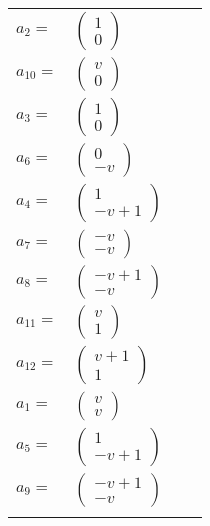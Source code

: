 \documentclass[1p]{elsarticle_modified}
\theoremstyle{definition}
\begin{document}
\begin{tabular}{m{7pt} m{180pt} m{7pt} m{180pt} }
\flushright $a_{2}=$&$\begin{pmatrix}1\\0\end{pmatrix}$ \\
\flushright $a_{10}=$&$\begin{pmatrix}v\\0\end{pmatrix}$ \\
\flushright $a_{3}=$&$\begin{pmatrix}1\\0\end{pmatrix}$ \\
\flushright $a_{6}=$&$\begin{pmatrix}0\\- v\end{pmatrix}$ \\
\flushright $a_{4}=$&$\begin{pmatrix}1\\- v+1\end{pmatrix}$ \\
\flushright $a_{7}=$&$\begin{pmatrix}- v\\- v\end{pmatrix}$ \\
\flushright $a_{8}=$&$\begin{pmatrix}- v+1\\- v\end{pmatrix}$ \\
\flushright $a_{11}=$&$\begin{pmatrix}v\\1\end{pmatrix}$ \\
\flushright $a_{12}=$&$\begin{pmatrix}v+1\\1\end{pmatrix}$ \\
\flushright $a_{1}=$&$\begin{pmatrix}v\\v\end{pmatrix}$ \\
\flushright $a_{5}=$&$\begin{pmatrix}1\\- v+1\end{pmatrix}$ \\
\flushright $a_{9}=$&$\begin{pmatrix}- v+1\\- v\end{pmatrix}$\\&\end{tabular}
\end{document}
